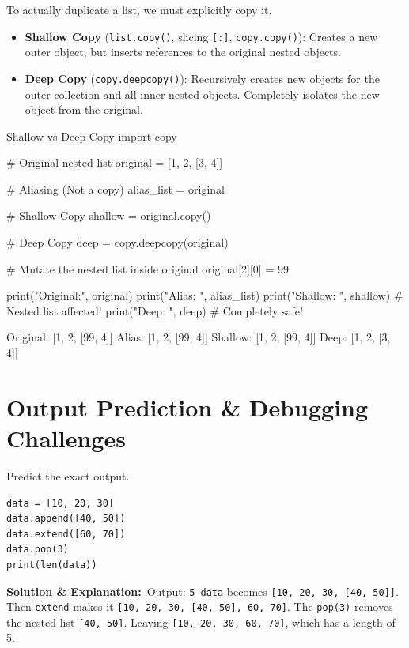 To actually duplicate a list, we must explicitly copy it.

\begin{conceptbox}
\begin{itemize}
    \item \textbf{Shallow Copy} (\texttt{list.copy()}, slicing \texttt{[:]}, \texttt{copy.copy()}): Creates a new outer object, but inserts references to the original nested objects.
    \item \textbf{Deep Copy} (\texttt{copy.deepcopy()}): Recursively creates new objects for the outer collection and all inner nested objects. Completely isolates the new object from the original.
\end{itemize}
\end{conceptbox}

\begin{pythoncode}[]{Shallow vs Deep Copy}
import copy

# Original nested list
original = [1, 2, [3, 4]]

# Aliasing (Not a copy)
alias_list = original

# Shallow Copy
shallow = original.copy()

# Deep Copy
deep = copy.deepcopy(original)

# Mutate the nested list inside original
original[2][0] = 99

print("Original:", original)
print("Alias:   ", alias_list)
print("Shallow: ", shallow)  # Nested list affected!
print("Deep:    ", deep)     # Completely safe!
\end{pythoncode}

\begin{outputbox}
Original: [1, 2, [99, 4]]
Alias:    [1, 2, [99, 4]]
Shallow:  [1, 2, [99, 4]]
Deep:     [1, 2, [3, 4]]
\end{outputbox}

\section{Output Prediction \& Debugging Challenges}

\begin{outputprediction}
\lpuBadge{} Predict the exact output.
\begin{lstlisting}[language=Python3]
data = [10, 20, 30]
data.append([40, 50])
data.extend([60, 70])
data.pop(3)
print(len(data))
\end{lstlisting}
\textbf{Solution \& Explanation:}\
Output: \texttt{5}\
\texttt{data} becomes \texttt{[10, 20, 30, [40, 50]]}. Then \texttt{extend} makes it \texttt{[10, 20, 30, [40, 50], 60, 70]}. The \texttt{pop(3)} removes the nested list \texttt{[40, 50]}. Leaving \texttt{[10, 20, 30, 60, 70]}, which has a length of 5.
\end{outputprediction}

